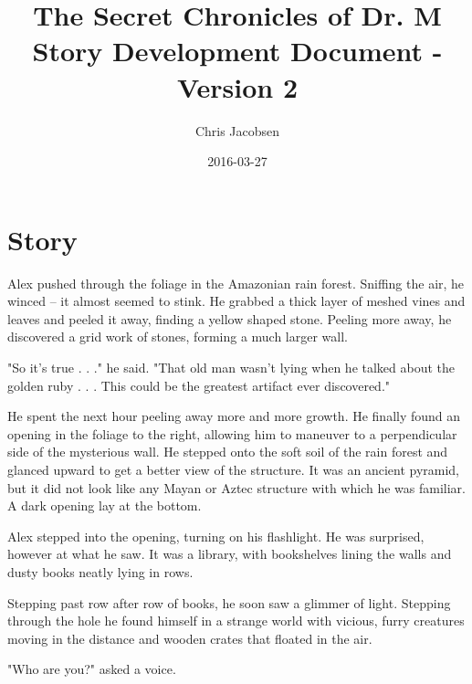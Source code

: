 \documentclass{gd-document}
\begin{document}
\title{The Secret Chronicles of Dr. M Story Development Document - Version 2}
\author{Chris Jacobsen}
\date{2016-03-27}
\maketitle{}

\tableofcontents

\section{Story}

Alex pushed through the foliage in the Amazonian rain forest. Sniffing
the air, he winced -- it almost seemed to stink. He grabbed a thick
layer of meshed vines and leaves and peeled it away, finding a yellow
shaped stone. Peeling more away, he discovered a grid work of stones,
forming a much larger wall.

"So it's true . . ." he said. "That old man wasn't lying when he
talked about the golden ruby . . . This could be the greatest artifact
ever discovered."

He spent the next hour peeling away more and more growth. He finally
found an opening in the foliage to the right, allowing him to maneuver
to a perpendicular side of the mysterious wall. He stepped onto the
soft soil of the rain forest and glanced upward to get a better view
of the structure. It was an ancient pyramid, but it did not look like
any Mayan or Aztec structure with which he was familiar. A dark
opening lay at the bottom.

Alex stepped into the opening, turning on his flashlight. He was
surprised, however at what he saw. It was a library, with bookshelves
lining the walls and dusty books neatly lying in rows.

Stepping past row after row of books, he soon saw a glimmer of
light. Stepping through the hole he found himself in a strange world
with vicious, furry creatures moving in the distance and wooden crates
that floated in the air.

"Who are you?" asked a voice.
\end{document}

